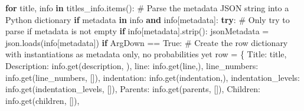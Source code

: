 \documentclass[
  11pt,
  letterpaper,
]{book}
\newenvironment{Shaded}{\begin{snugshade}}{\end{snugshade}}
\newcommand{\CommentTok}[1]{\textcolor[rgb]{0.37,0.37,0.37}{#1}}
\newcommand{\ControlFlowTok}[1]{\textcolor[rgb]{0.00,0.23,0.31}{\textbf{#1}}}
\newcommand{\KeywordTok}[1]{\textcolor[rgb]{0.00,0.23,0.31}{\textbf{#1}}}
\newcommand{\NormalTok}[1]{\textcolor[rgb]{0.00,0.23,0.31}{#1}}
\newcommand{\OperatorTok}[1]{\textcolor[rgb]{0.37,0.37,0.37}{#1}}
\newcommand{\StringTok}[1]{\textcolor[rgb]{0.13,0.47,0.30}{#1}}
\newcommand{\VariableTok}[1]{\textcolor[rgb]{0.07,0.07,0.07}{#1}}
\begin{document}
\begin{Shaded}
\begin{Highlighting}[]
    \ControlFlowTok{for}\NormalTok{ title, info }\KeywordTok{in}\NormalTok{ titles\_info.items():}
        \CommentTok{\# Parse the metadata JSON string into a Python dictionary}
        \ControlFlowTok{if} \StringTok{\textquotesingle{}metadata\textquotesingle{}} \KeywordTok{in}\NormalTok{ info }\KeywordTok{and}\NormalTok{ info[}\StringTok{\textquotesingle{}metadata\textquotesingle{}}\NormalTok{]:}
            \ControlFlowTok{try}\NormalTok{:}
                \CommentTok{\# Only try to parse if metadata is not empty}
                \ControlFlowTok{if}\NormalTok{ info[}\StringTok{\textquotesingle{}metadata\textquotesingle{}}\NormalTok{].strip():}
\NormalTok{                    jsonMetadata }\OperatorTok{=}\NormalTok{ json.loads(info[}\StringTok{\textquotesingle{}metadata\textquotesingle{}}\NormalTok{])}
                    \ControlFlowTok{if}\NormalTok{ ArgDown }\OperatorTok{==} \VariableTok{True}\NormalTok{:}
                        \CommentTok{\# Create the row dictionary with instantiations as metadata only, no probabilities yet}
\NormalTok{                        row }\OperatorTok{=}\NormalTok{ \{}
                            \StringTok{\textquotesingle{}Title\textquotesingle{}}\NormalTok{: title,}
                            \StringTok{\textquotesingle{}Description\textquotesingle{}}\NormalTok{: info.get(}\StringTok{\textquotesingle{}description\textquotesingle{}}\NormalTok{, }\StringTok{\textquotesingle{}\textquotesingle{}}\NormalTok{),}
                            \StringTok{\textquotesingle{}line\textquotesingle{}}\NormalTok{: info.get(}\StringTok{\textquotesingle{}line\textquotesingle{}}\NormalTok{,}\StringTok{\textquotesingle{}\textquotesingle{}}\NormalTok{),}
                            \StringTok{\textquotesingle{}line\_numbers\textquotesingle{}}\NormalTok{: info.get(}\StringTok{\textquotesingle{}line\_numbers\textquotesingle{}}\NormalTok{, []),}
                            \StringTok{\textquotesingle{}indentation\textquotesingle{}}\NormalTok{: info.get(}\StringTok{\textquotesingle{}indentation\textquotesingle{}}\NormalTok{,}\StringTok{\textquotesingle{}\textquotesingle{}}\NormalTok{),}
                            \StringTok{\textquotesingle{}indentation\_levels\textquotesingle{}}\NormalTok{: info.get(}\StringTok{\textquotesingle{}indentation\_levels\textquotesingle{}}\NormalTok{, []),}
                            \StringTok{\textquotesingle{}Parents\textquotesingle{}}\NormalTok{: info.get(}\StringTok{\textquotesingle{}parents\textquotesingle{}}\NormalTok{, []),}
                            \StringTok{\textquotesingle{}Children\textquotesingle{}}\NormalTok{: info.get(}\StringTok{\textquotesingle{}children\textquotesingle{}}\NormalTok{, []),}

\end{Highlighting}
\end{Shaded}
\end{document}
